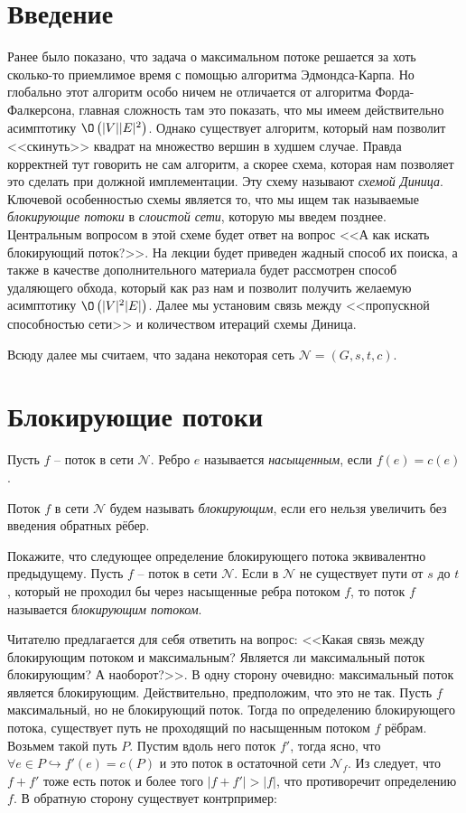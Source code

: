 \section{Введение}

Ранее было показано, что задача о максимальном потоке решается за хоть сколько-то приемлимое время с помощью алгоритма Эдмондса-Карпа. 
Но глобально этот алгоритм особо ничем не отличается от алгоритма Форда-Фалкерсона, главная сложность там это показать, что мы имеем действительно асимптотику $\O\left(|V||E|^2\right)$.
Однако существует алгоритм, который нам позволит <<скинуть>> квадрат на множество вершин в худшем случае. Правда корректней тут говорить не сам алгоритм, а скорее схема, которая нам позволяет это сделать при должной имплементации. 
Эту схему называют \textit{схемой Диница}. Ключевой особенностью схемы является то, что мы ищем так называемые \textit{блокирующие потоки} в \textit{слоистой сети}, которую мы введем позднее. Центральным вопросом в этой схеме будет ответ на вопрос <<А как искать блокирующий поток?>>. 
На лекции будет приведен жадный способ их поиска, а также в качестве дополнительного материала будет рассмотрен способ удаляющего обхода, который как раз нам и позволит получить желаемую асимптотику $\O\left(|V|^2|E|\right)$.
Далее мы установим связь между <<пропускной способностью сети>> и количеством итераций схемы Диница.

Всюду далее мы считаем, что задана некоторая сеть $\mathcal{N} = (G, s, t, c)$.

\section{Блокирующие потоки}

\Def Пусть $f$ -- поток в сети $\mathcal{N}$. Ребро $e$ называется \textit{насыщенным}, если $f(e) = c(e)$.

\Def Поток $f$ в сети $\mathcal{N}$ будем называть \textit{блокирующим}, если его нельзя увеличить без введения обратных рёбер.

\Exe Покажите, что следующее определение блокирующего потока эквивалентно предыдущему. Пусть $f$ -- поток в сети $\mathcal{N}$. 
Если в $\mathcal{N}$ не существует пути от $s$ до $t$, который не проходил бы через насыщенные ребра потоком $f$, то поток $f$ называется \textit{блокирующим потоком}.

Читателю предлагается для себя ответить на вопрос: <<Какая связь между блокирующим потоком и максимальным? Является ли максимальный поток блокирующим? А наоборот?>>. В одну сторону очевидно: максимальный поток является блокирующим. Действительно, предположим, что это не так. 
Пусть $f$ максимальный, но не блокирующий поток. Тогда по определению блокирующего потока, существует путь не проходящий по насыщенным потоком $f$ рёбрам.
Возьмем такой путь $P$. Пустим вдоль него поток $f'$, тогда ясно, что $\forall e \in P \hookrightarrow f'(e) = c(P)$ и это поток в остаточной сети $\mathcal{N}_f$. 
Из  следует, что $f + f'$ тоже есть поток и более того $|f + f'| > |f|$, что противоречит определению $f$. В обратную сторону существует контрпример:

